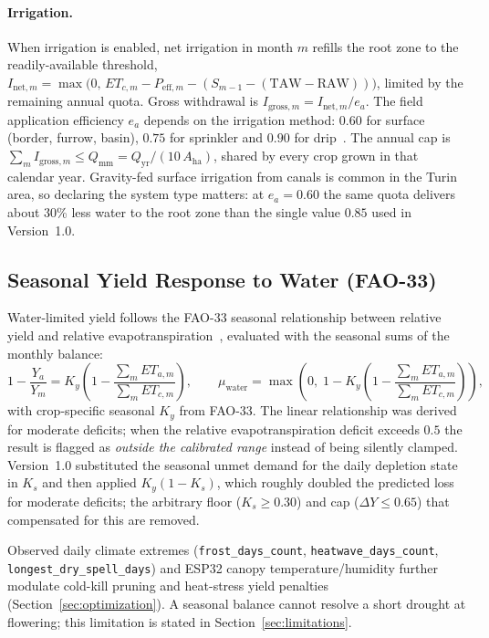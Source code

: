 \paragraph{Irrigation.} When irrigation is enabled, net irrigation in month $m$ refills the root zone to the readily-available threshold, $I_{\mathrm{net},m} = \max\bigl(0,\, ET_{c,m} - P_{\mathrm{eff},m} - (S_{m-1} - (\mathrm{TAW} - \mathrm{RAW}))\bigr)$, limited by the remaining annual quota. Gross withdrawal is $I_{\mathrm{gross},m} = I_{\mathrm{net},m}/e_a$. The field application efficiency $e_a$ depends on the irrigation method: $0.60$ for surface (border, furrow, basin), $0.75$ for sprinkler and $0.90$ for drip~\cite{fao_irrigation_efficiency}. The annual cap is $\sum_m I_{\mathrm{gross},m} \le Q_{\mathrm{mm}} = Q_{\mathrm{yr}}/(10\,A_{\mathrm{ha}})$, shared by every crop grown in that calendar year. Gravity-fed surface irrigation from canals is common in the Turin area, so declaring the system type matters: at $e_a = 0.60$ the same quota delivers about 30\% less water to the root zone than the single value $0.85$ used in Version~1.0.

\subsection{Seasonal Yield Response to Water (FAO-33)}
Water-limited yield follows the FAO-33 seasonal relationship between relative yield and relative evapotranspiration~\cite{doorenbos1979fao33}, evaluated with the seasonal sums of the monthly balance:
\begin{equation}
  1 - \frac{Y_a}{Y_m} = K_y \left(1 - \frac{\sum_m ET_{a,m}}{\sum_m ET_{c,m}}\right), \qquad
  \mu_{\mathrm{water}} = \max\!\left(0,\; 1 - K_y \left(1 - \frac{\sum_m ET_{a,m}}{\sum_m ET_{c,m}}\right)\right),
\end{equation}
with crop-specific seasonal $K_y$ from FAO-33. The linear relationship was derived for moderate deficits; when the relative evapotranspiration deficit exceeds $0.5$ the result is flagged as \emph{outside the calibrated range} instead of being silently clamped. Version~1.0 substituted the seasonal unmet demand for the daily depletion state in $K_s$ and then applied $K_y(1-K_s)$, which roughly doubled the predicted loss for moderate deficits; the arbitrary floor ($K_s \ge 0.30$) and cap ($\Delta Y \le 0.65$) that compensated for this are removed.

Observed daily climate extremes (\texttt{frost\_\allowbreak days\_\allowbreak count}, \texttt{heatwave\_\allowbreak days\_\allowbreak count}, \texttt{longest\_\allowbreak dry\_\allowbreak spell\_\allowbreak days}) and ESP32 canopy temperature/humidity further modulate cold-kill pruning and heat-stress yield penalties (Section~\ref{sec:optimization}). A seasonal balance cannot resolve a short drought at flowering; this limitation is stated in Section~\ref{sec:limitations}.
